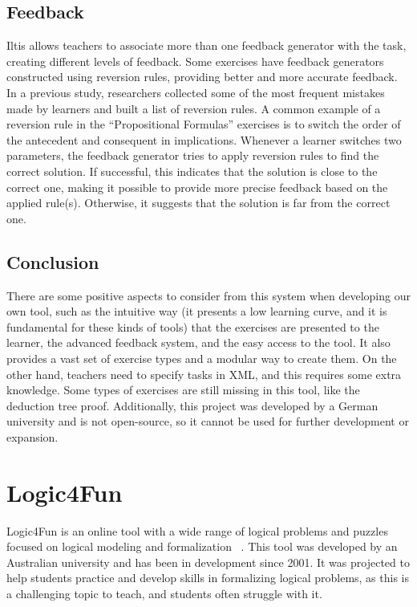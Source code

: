 \subsection{Feedback}
\label{chap:iltis-feedback}
Iltis allows teachers to associate more than one feedback generator with the task, creating different levels of feedback. Some exercises have feedback generators constructed using reversion rules, providing better and more accurate feedback. In a previous study, researchers collected some of the most frequent mistakes made by learners and built a list of reversion rules. A common example of a reversion rule in the “Propositional Formulas” exercises is to switch the order of the antecedent and consequent in implications. Whenever a learner switches two parameters, the feedback generator tries to apply reversion rules to find the correct solution. If successful, this indicates that the solution is close to the correct one, making it possible to provide more precise feedback based on the applied rule(s). Otherwise, it suggests that the solution is far from the correct one.

\subsection{Conclusion}
There are some positive aspects to consider from this system when developing our own tool, such as the intuitive way (it presents a low learning curve, and it is fundamental for these kinds of tools) that the exercises are presented to the learner, the advanced feedback system, and the easy access to the tool. It also provides a vast set of exercise types and a modular way to create them. On the other hand, teachers need to specify tasks in XML, and this requires some extra knowledge. Some types of exercises are still missing in this tool, like the deduction tree proof. Additionally, this project was developed by a German university and is not open-source, so it cannot be used for further development or expansion.

\section{Logic4Fun}
Logic4Fun is an online tool with a wide range of logical problems and puzzles focused on logical modeling and formalization ~\cite{logic4fun}.
This tool was developed by an Australian university and has been in development since 2001. It was projected to help students practice and develop skills in formalizing logical problems, as this is a challenging topic to teach, and students often struggle with it.

